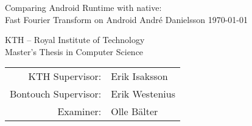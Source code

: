 \documentclass[12pt,a4paper,openright,parskip,final,twoside,en]{csee_msc_thesis} %
\begin{document}
\def\thesistitle{\Large Comparing Android Runtime with native:\\ Fast Fourier Transform on Android}
\def\theauthor{\large André Danielsson}
\def\theaddress{
    KTH -- Royal Institute of Technology\\
    \vspace{3mm}
    Master's Thesis in Computer Science\\
    \vspace{3cm}
    \begin{tabular}{rl}
        KTH Supervisor: & Erik Isaksson\\
        Bontouch Supervisor: & Erik Westenius\\
        Examiner: & Olle Bälter
    \end{tabular}
}
\def\theabstract{}
\def\thedate{\today}
\def\thepreface{}
\def\thesweabstract{}

\startpreamble
  {\thesistitle}
  {\theauthor}
  {\thedate}
  {\theabstract}
  {\thepreface}
  {\theaddress}
  {\thesweabstract}















\fancyhead[LO]{}%
\fancyhead[RE]{}%
\fancyhead[LE]{\thepage}%
\fancyhead[RO]{\thepage}




\appendix




\end{document}
